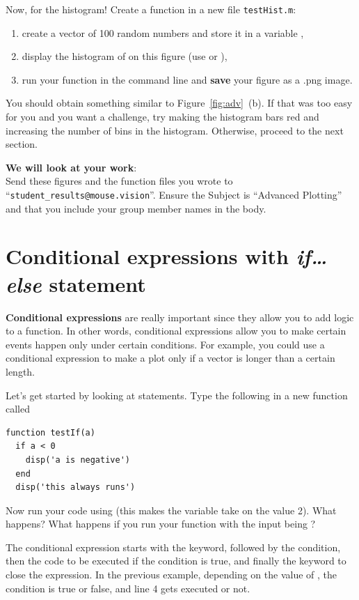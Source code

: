 \documentclass{article}
\begin{document}
Now, for the histogram! Create a  function in a new file \verb|testHist.m|:
\begin{enumerate}
  \item create a vector of 100 random numbers and store it in a variable ,
  \item display the histogram of  on this figure (use  or ),
  \item run your function in the command line and \textbf{save} your figure as a .png image.
\end{enumerate}
You should obtain something similar to Figure~\ref{fig:adv}~(b). 
If that was too easy for you and you want a challenge, try making the histogram bars red and increasing the number of bins in the histogram. 
Otherwise, proceed to the next section. 

\textbf{We will look at your work}: \\
Send these figures and the function files you wrote to ``\verb|student_results@mouse.vision|''. 
Ensure the Subject is ``Advanced Plotting'' and that you include your group member names in the body.

\pagebreak

\section{Conditional expressions with \emph{if\dots else} statement}

\textbf{Conditional expressions} are really important since they allow you to add logic to a function.
In other words, conditional expressions allow you to make certain events happen only under certain conditions. 
For example, you could use a conditional expression to make a plot only if a vector is longer than a certain length.

Let's get started by looking at  statements. Type the following in a new function called 
\begin{lstlisting}
function testIf(a)
  if a < 0
    disp('a is negative')
  end
  disp('this always runs')
\end{lstlisting}

Now run your code using  (this makes the variable  take on the value 2).
What happens?
What happens if you run your function with the input being ?


The conditional expression starts with the  keyword, followed by the condition, then the code to be executed if the condition is true, and finally the  keyword to close the expression.
In the previous example, depending on the value of , the condition  is true or false, and line 4 gets executed or not.
\end{document}
